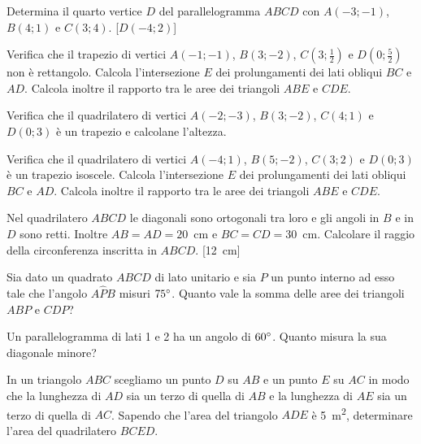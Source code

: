 \begin{multicols}{2}
\begin{esercizio}
\label{ese:7.96}
Determina il quarto vertice $D$ del parallelogramma $ABCD$ con $A(-3;-1)$, $B(4;1)$ e $C(3;4)$.
[$D(-4;2)$]
\end{esercizio}

\begin{esercizio}
\label{ese:7.97}
Verifica che il trapezio di vertici $A(-1;-1)$, $B(3;-2)$, $C\left(3;\frac{1}{2}\right)$ e $D\left(0;\frac{5}{2}\right)$ non è rettangolo. Calcola l'intersezione $E$ dei prolungamenti dei lati obliqui $BC$ e $AD$. Calcola inoltre il rapporto tra le aree dei triangoli $ABE$ e $CDE$.
\end{esercizio}

\begin{esercizio}
\label{ese:7.98}
Verifica che il quadrilatero di vertici $A(-2;-3)$, $B(3;-2)$, $C(4;1)$ e $D(0;3)$ è un trapezio e calcolane l'altezza.
\end{esercizio}

\begin{esercizio}
\label{ese:7.99}
Verifica che il quadrilatero di vertici $A(-4;1)$, $B(5;-2)$, $C(3;2)$ e $D(0;3)$ è un trapezio isoscele. Calcola l'intersezione $E$ dei prolungamenti dei lati obliqui $BC$ e $AD$. Calcola inoltre il rapporto tra le aree dei triangoli $ABE$ e $CDE$.
\end{esercizio}

\begin{esercizio}
\label{ese:7.100}
Nel quadrilatero $ABCD$ le diagonali sono ortogonali tra loro e gli angoli in $B$ e in $D$ sono retti. Inoltre $AB=AD=20$~cm e $BC=CD=30$~cm. Calcolare il raggio della circonferenza inscritta in $ABCD$.
[12~cm]
\end{esercizio}

\begin{esercizio}
\label{ese:7.101}
Sia dato un quadrato $ABCD$ di lato unitario e sia $P$ un punto interno ad esso tale che l'angolo $A\widehat{P}B$ misuri $75{}^{\circ}$. Quanto vale la somma delle aree dei triangoli $ABP$ e $CDP$? 
\end{esercizio}

\begin{esercizio}
\label{ese:7.102}
Un parallelogramma di lati 1 e 2 ha un angolo di $60{}^{\circ}$. Quanto misura la sua diagonale minore?   
\end{esercizio}

\begin{esercizio}
\label{ese:7.103}
In un triangolo $ABC$ scegliamo un punto $D$ su $AB$ e un punto $E$ su $AC$ in modo che la lunghezza di $AD$ sia un terzo di quella di $AB$ e la lunghezza di $AE$ sia un terzo di quella di $AC$. Sapendo che l'area del triangolo $ADE$ è 5~m\textsuperscript{2}, determinare l'area del quadrilatero $BCED$.
\end{esercizio}


\end{multicols}
